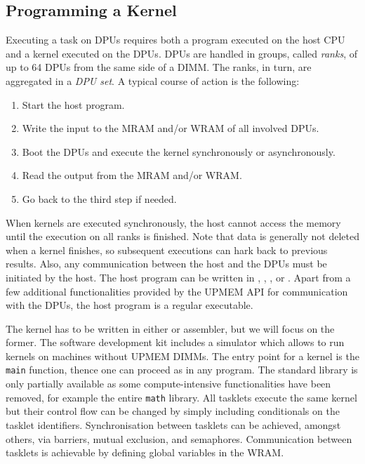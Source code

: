 \subsection{Programming a Kernel}
\label{sec:prereq:arch:code}

Executing a task on \acp{DPU} requires both a program executed on the host \ac{CPU} and a kernel executed on the \acp{DPU}.
\Acp{DPU} are handled in groups, called \emph{ranks}, of up to 64 \acp{DPU} from the same side of a \ac{DIMM}.
The ranks, in turn, are aggregated in a \emph{\ac{DPU} set}.
A typical course of action is the following:
\begin{enumerate}
	\item
	Start the host program.

	\item
	Write the input to the \ac{MRAM} and/or \ac{WRAM} of all involved \acp{DPU}.

	\item
	Boot the \acp{DPU} and execute the kernel synchronously or asynchronously.

	\item
	Read the output from the \ac{MRAM} and/or \ac{WRAM}.

	\item
	Go back to the third step if needed.
\end{enumerate}
When kernels are executed synchronously, the host cannot access the memory until the execution on all ranks is finished.
Note that data is generally not deleted when a kernel finishes, so subsequent executions can hark back to previous results.
Also, any communication between the host and the \acp{DPU} must be initiated by the host.
The host program can be written in \langC{}, \langCpp{}, \langJava{}, or \langPython{}.
Apart from a few additional functionalities provided by the UPMEM \ac{API} for communication with the \acp{DPU}, the host program is a regular executable.

The kernel has to be written in either \langC{} or assembler, but we will focus on the former.
The software development kit includes a simulator which allows to run kernels on machines without UPMEM \acp{DIMM}.
The entry point for a kernel is the \lstinline|main| function, thence one can proceed as in any \langC{} program.
The \langC{} standard library is only partially available as some compute-intensive functionalities have been removed, for example the entire \lstinline|math| library.
All tasklets execute the same kernel but their control flow can be changed by simply including conditionals on the tasklet identifiers.
Synchronisation between tasklets can be achieved, amongst others, via barriers, mutual exclusion, and semaphores.
Communication between tasklets is achievable by defining global variables in the \ac{WRAM}.

